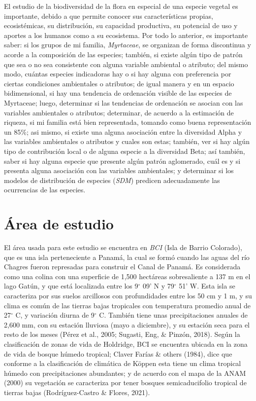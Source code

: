 \documentclass[11pt,]{article}
\begin{document}
El estudio de la biodiversidad de la flora en especial de una especie
vegetal es importante, debido a que permite conocer sus características
propias, ecosistémicas, su distribución, su capacidad productiva, su
potencial de uso y aportes a los humanos como a su ecosistema. Por todo
lo anterior, es importante saber: si los grupos de mi familia,
\emph{Myrtaceae}, se organizan de forma discontinua y acorde a la
composición de las especies; también, si existe algún tipo de patrón que
sea o no sea consistente con alguna variable ambiental o atributo; del
mismo modo, cuántas especies indicadoras hay o si hay alguna con
preferencia por ciertas condiciones ambientales o atributos; de igual
manera y en un espacio bidimensional, si hay una tendencia de ordenación
visible de las especies de Myrtaceae; luego, determinar si las
tendencias de ordenación se asocian con las variables ambientales o
atributos; determinar, de acuerdo a la estimación de riqueza, si mi
familia está bien representada, tomando como buena representación un
85\%; asi mismo, si existe una alguna asociación entre la diversidad
Alpha y las variables ambientales o atributos y cuales son estas;
también, ver si hay algún tipo de contribución local o de alguna especie
a la diversidad Beta; así también, saber si hay alguna especie que
presente algún patrón aglomerado, cuál es y si presenta alguna
asociación con las variables ambientales; y determinar si los modelos de
distribución de especies (\emph{SDM}) predicen adecuadamente las
ocurrencias de las especies.

\section{Área de estudio}\label{uxe1rea-de-estudio}

El área usada para este estudio se encuentra en \emph{BCI} (Isla de
Barrio Colorado), que es una isla perteneciente a Panamá, la cual se
formó cuando las aguas del río Chagres fueron represadas para construir
el Canal de Panamá. Es considerada como una colina con una superficie de
1,500 hectáreas sobresaliente a 137 m en el lago Gatún, y que está
localizada entre los 9\(^\circ\) 09' N y 79\(^\circ\) 51' W. Esta isla
se caracteriza por sus suelos arcillosos con profundidades entre los 50
cm y 1 m, y su clima es común de las tierras bajas tropicales con
temperatura promedio anual de 27\(^\circ\) C, y variación diurna de
9\(^\circ\) C. También tiene unas precipitaciones anuales de 2,600 mm,
con su estación lluviosa (mayo a diciembre), y su estación seca para el
resto de los meses (Pérez et al., 2005; Sugasti, Eng, \& Pinzón, 2018).
Según la clasificación de zonas de vida de Holdridge, BCI se encuentra
ubicada en la zona de vida de bosque húmedo tropical; Claver Farías \&
others (1984), dice que conforme a la clasificación de climática de
Köppen esta tiene un clima tropical húmedo con precipitaciones
abundantes; y de acuerdo con el mapa de la ANAM (2000) su vegetación se
caracteriza por tener bosques semicaducifolio tropical de tierras bajas
(Rodríguez-Castro \& Flores, 2021).
\end{document}
